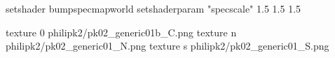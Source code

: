 setshader bumpspecmapworld
setshaderparam "specscale" 1.5 1.5 1.5

texture 0 philipk2/pk02_generic01b_C.png
texture n philipk2/pk02_generic01_N.png
texture s philipk2/pk02_generic01_S.png

